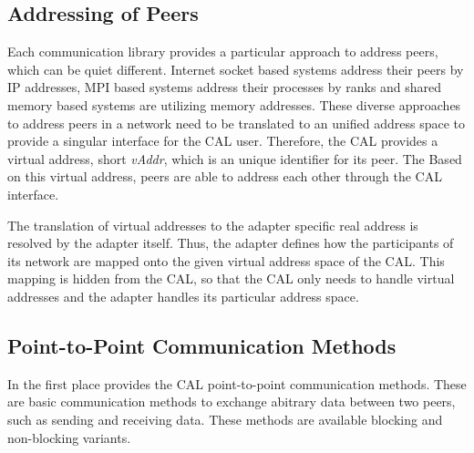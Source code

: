 \subsection{Addressing of Peers}
Each communication library provides a particular approach to address
peers, which can be quiet different. Internet socket based systems
address their peers by IP addresses, MPI based systems address their
processes by ranks and shared memory based systems are utilizing
memory addresses.  These diverse approaches to address peers in a
network need to be translated to an unified address space to provide a
singular interface for the CAL user.  Therefore, the CAL provides a
virtual address, short \emph{vAddr}, which is an unique identifier for
its peer. The Based on this virtual address, peers are able to address
each other through the CAL interface.

The translation of virtual addresses to the adapter specific real
address is resolved by the adapter itself. Thus, the adapter defines
how the participants of its network are mapped onto the given virtual
address space of the CAL. This mapping is hidden from the CAL, so that
the CAL only needs to handle virtual addresses and the adapter handles
its particular address space.

\subsection{Point-to-Point Communication Methods}
\label{sec:des:p2p}

In the first place provides the CAL point-to-point communication
methods. These are basic communication methods to exchange abitrary
data between two peers, such as sending and receiving data.  These
methods are available blocking and non-blocking variants.

